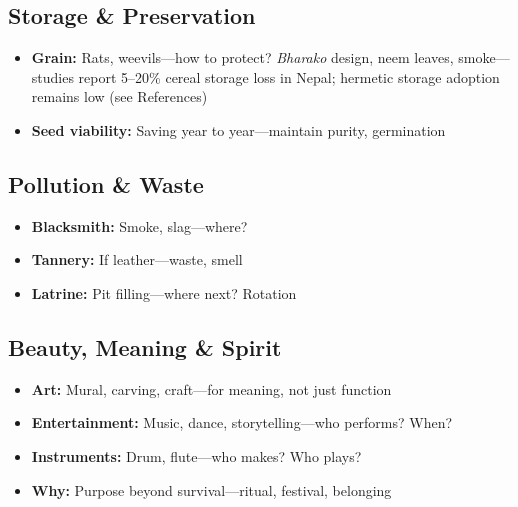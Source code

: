 \documentclass[11pt,a4paper]{article}
\begin{document}
\subsection{Storage \& Preservation}
\begin{itemize}
    \item \textbf{Grain:} Rats, weevils---how to protect? \textit{Bharako} design, neem leaves, smoke---studies report 5--20\% cereal storage loss in Nepal; hermetic storage adoption remains low (see References)
    \item \textbf{Seed viability:} Saving year to year---maintain purity, germination
\end{itemize}

\subsection{Pollution \& Waste}
\begin{itemize}
    \item \textbf{Blacksmith:} Smoke, slag---where?
    \item \textbf{Tannery:} If leather---waste, smell
    \item \textbf{Latrine:} Pit filling---where next? Rotation
\end{itemize}

\subsection{Beauty, Meaning \& Spirit}
\begin{itemize}
    \item \textbf{Art:} Mural, carving, craft---for meaning, not just function
    \item \textbf{Entertainment:} Music, dance, storytelling---who performs? When?
    \item \textbf{Instruments:} Drum, flute---who makes? Who plays?
    \item \textbf{Why:} Purpose beyond survival---ritual, festival, belonging
\end{itemize}
\end{document}
